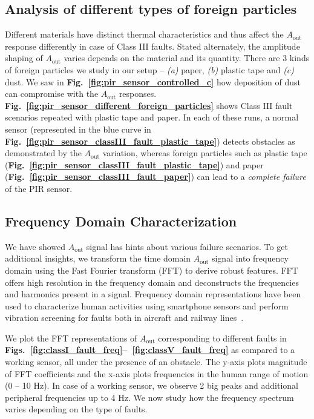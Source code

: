 \documentclass[manuscript]{acmart}
\newcommand{\ca}{{\it (a) }}
\newcommand{\cb}{{\it (b) }}
\newcommand{\cc}{{\it (c) }}
\newcommand{\aout}{$A_{\text{out}}$\xspace}
\begin{document}
\subsection{Analysis of different types of foreign particles} \label{subsec:foreign_additional}Different materials have distinct thermal characteristics and thus affect the \aout response differently in case of Class III faults. Stated alternately, the amplitude shaping of \aout varies depends on the material and its quantity. There are 3 kinds of foreign particles we study in our setup -- \ca paper, \cb plastic tape and \cc dust. We saw in {\bfseries Fig.~\ref{fig:pir_sensor_controlled_c}} how deposition of dust can compromise with the \aout responses. {\bfseries Fig.~\ref{fig:pir_sensor_different_foreign_particles}} shows Class III fault scenarios repeated with plastic tape and paper. In each of these runs, a normal sensor (represented in the blue curve in {\bfseries Fig.~\ref{fig:pir_sensor_classIII_fault_plastic_tape}}) detects obstacles as demonstrated by the \aout variation, whereas foreign particles such as plastic tape ({\bfseries Fig.~\ref{fig:pir_sensor_classIII_fault_plastic_tape}}) and paper ({\bfseries Fig.~\ref{fig:pir_sensor_classIII_fault_paper}}) can lead to a \textit{complete failure} of the PIR sensor.

\subsection{Frequency Domain Characterization} \label{subsec:freq_char} We have showed \aout signal has hints about various failure scenarios. To get additional insights, we transform the time domain \aout signal into frequency domain using the Fast Fourier transform (FFT) to derive robust features. FFT offers high resolution in the frequency domain and deconstructs the frequencies and harmonics present in a signal. Frequency domain representations have been used to characterize human activities using smartphone sensors and perform vibration screening for faults both in aircraft and railway lines~\cite{anguita2013public, HanlyWhy}.

We plot the FFT representations of \aout corresponding to different faults in {\bfseries Figs.~\ref{fig:classI_fault_freq}--~\ref{fig:classV_fault_freq}} as compared to a working sensor, all under the presence of an obstacle. The y-axis plots magnitude of FFT coefficients and the x-axis plots frequencies in the human range of motion (0 -- 10 Hz). In case of a working sensor, we observe 2 big peaks and additional peripheral frequencies up to 4 Hz. We now study how the frequency spectrum varies depending on the type of faults.
\end{document}
